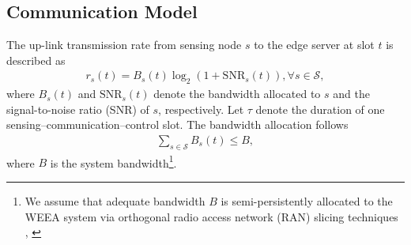 \documentclass[lettersize,journal]{IEEEtran}
\theoremstyle{custom}
\begin{document}




\subsection{Communication Model}
The up-link transmission rate from sensing node $s$ to the edge server at slot $t$ is described as
\begin{align}
    r_{s}(t) = B_s(t) \log_2\left(1 + \mathrm{SNR}_s(t) \right), \forall s \in \mathcal{S}, 
\end{align}
where $B_s(t)$ and $\mathrm{SNR}_s(t)$ denote the bandwidth allocated to $s$ and the signal-to-noise ratio (SNR) of $s$, respectively. Let $\tau$ denote the duration of one sensing--communication--control slot. The bandwidth allocation follows
\begin{align}\label{bandwidth_cons}
    \sum_{s \in \mathcal{S}}B_s(t) \leq B, 
\end{align}
where $B$ is the system bandwidth\footnote{We assume that adequate bandwidth $B$ is semi-persistently allocated to the WEEA system via orthogonal radio access network (RAN) slicing techniques \cite{}, \cite{}}. 
\end{document}
